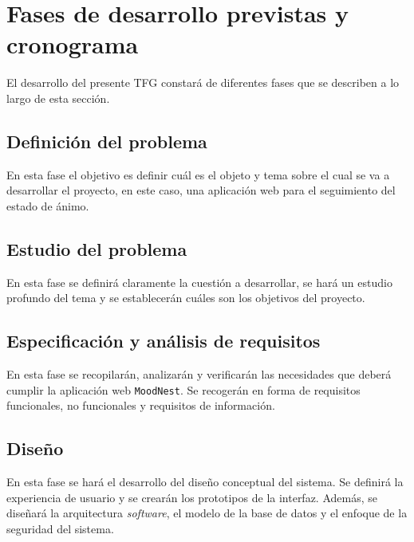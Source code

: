 \section{Fases de desarrollo previstas y cronograma}
\label{sec:fases}

El desarrollo del presente TFG constará de diferentes fases que se describen a lo largo de esta sección.

\vspace{-0.15cm}

\subsection{Definición del problema}
En esta fase el objetivo es definir cuál es el objeto y tema sobre el cual se va a desarrollar el proyecto, en este caso, una aplicación web para el seguimiento del estado de ánimo.

\vspace{-0.15cm}

\subsection{Estudio del problema}
En esta fase se definirá claramente la cuestión a desarrollar, se hará un estudio profundo del tema y se establecerán cuáles son los objetivos del proyecto.

\vspace{-0.15cm}

\subsection{Especificación y análisis de requisitos}
En esta fase se recopilarán, analizarán y verificarán las necesidades que deberá cumplir la aplicación web \texttt{MoodNest}. Se recogerán en forma de requisitos funcionales, no funcionales y requisitos de información.

\vspace{-0.15cm}

\subsection{Diseño}
En esta fase se hará el desarrollo del diseño conceptual del sistema. Se definirá la experiencia de usuario y se crearán los prototipos de la interfaz. Además, se diseñará la arquitectura \textit{software}, el modelo de la base de datos y el enfoque de la seguridad del sistema.

\vspace{-0.15cm}

